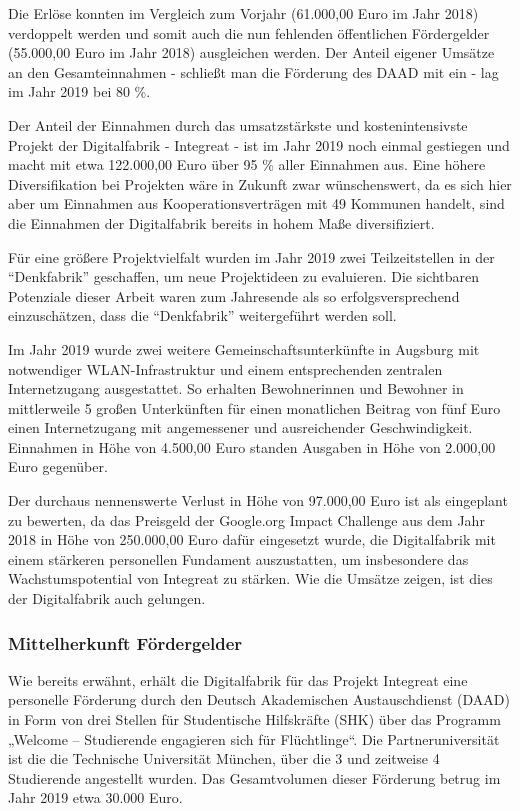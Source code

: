 \documentclass[12pt, a4paper]{article} %
\begin{document}
Die Erlöse konnten im Vergleich zum Vorjahr (61.000,00 Euro im Jahr
2018) verdoppelt werden und somit auch die nun fehlenden öffentlichen
Fördergelder (55.000,00 Euro im Jahr 2018) ausgleichen werden. Der
Anteil eigener Umsätze an den Gesamteinnahmen - schließt man die
Förderung des DAAD mit ein - lag im Jahr 2019 bei 80 \%.

Der Anteil der Einnahmen durch das umsatzstärkste und kostenintensivste
Projekt der Digitalfabrik - Integreat - ist im Jahr 2019 noch einmal
gestiegen und macht mit etwa 122.000,00 Euro über 95 \% aller Einnahmen
aus. Eine höhere Diversifikation bei Projekten wäre in Zukunft zwar
wünschenswert, da es sich hier aber um Einnahmen aus
Kooperationsverträgen mit 49 Kommunen handelt, sind die Einnahmen der
Digitalfabrik bereits in hohem Maße diversifiziert.

Für eine größere Projektvielfalt wurden im Jahr 2019 zwei
Teilzeitstellen in der “Denkfabrik” geschaffen, um neue Projektideen zu
evaluieren. Die sichtbaren Potenziale dieser Arbeit waren zum Jahresende
als so erfolgsversprechend einzuschätzen, dass die “Denkfabrik”
weitergeführt werden soll.

Im Jahr 2019 wurde zwei weitere Gemeinschaftsunterkünfte in Augsburg mit
notwendiger WLAN-Infrastruktur und einem entsprechenden zentralen
Internetzugang ausgestattet. So erhalten Bewohnerinnen und Bewohner in
mittlerweile 5 großen Unterkünften für einen monatlichen Beitrag von
fünf Euro einen Internetzugang mit angemessener und ausreichender
Geschwindigkeit. Einnahmen in Höhe von 4.500,00 Euro standen Ausgaben in
Höhe von 2.000,00 Euro gegenüber.

Der durchaus nennenswerte Verlust in Höhe von 97.000,00 Euro ist als
eingeplant zu bewerten, da das Preisgeld der Google.org Impact Challenge
aus dem Jahr 2018 in Höhe von 250.000,00 Euro dafür eingesetzt wurde,
die Digitalfabrik mit einem stärkeren personellen Fundament
auszustatten, um insbesondere das Wachstumspotential von Integreat zu
stärken. Wie die Umsätze zeigen, ist dies der Digitalfabrik auch
gelungen.

\hypertarget{mittelherkunft-fuxf6rdergelder}{%
\subsubsection{Mittelherkunft
Fördergelder}\label{mittelherkunft-fuxf6rdergelder}}

Wie bereits erwähnt, erhält die Digitalfabrik für das Projekt Integreat
eine personelle Förderung durch den Deutsch Akademischen Austauschdienst
(DAAD) in Form von drei Stellen für Studentische Hilfskräfte (SHK) über
das Programm „Welcome – Studierende engagieren sich für Flüchtlinge“.
Die Partneruniversität ist die die Technische Universität München, über
die 3 und zeitweise 4 Studierende angestellt wurden. Das Gesamtvolumen
dieser Förderung betrug im Jahr 2019 etwa 30.000 Euro.
\end{document}
